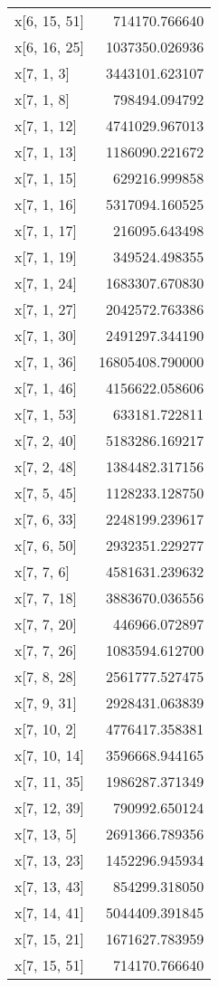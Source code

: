 \begin{longtable}{lr}
x[6, 15, 51] & 714170.766640 \\
x[6, 16, 25] & 1037350.026936 \\
x[7, 1, 3] & 3443101.623107 \\
x[7, 1, 8] & 798494.094792 \\
x[7, 1, 12] & 4741029.967013 \\
x[7, 1, 13] & 1186090.221672 \\
x[7, 1, 15] & 629216.999858 \\
x[7, 1, 16] & 5317094.160525 \\
x[7, 1, 17] & 216095.643498 \\
x[7, 1, 19] & 349524.498355 \\
x[7, 1, 24] & 1683307.670830 \\
x[7, 1, 27] & 2042572.763386 \\
x[7, 1, 30] & 2491297.344190 \\
x[7, 1, 36] & 16805408.790000 \\
x[7, 1, 46] & 4156622.058606 \\
x[7, 1, 53] & 633181.722811 \\
x[7, 2, 40] & 5183286.169217 \\
x[7, 2, 48] & 1384482.317156 \\
x[7, 5, 45] & 1128233.128750 \\
x[7, 6, 33] & 2248199.239617 \\
x[7, 6, 50] & 2932351.229277 \\
x[7, 7, 6] & 4581631.239632 \\
x[7, 7, 18] & 3883670.036556 \\
x[7, 7, 20] & 446966.072897 \\
x[7, 7, 26] & 1083594.612700 \\
x[7, 8, 28] & 2561777.527475 \\
x[7, 9, 31] & 2928431.063839 \\
x[7, 10, 2] & 4776417.358381 \\
x[7, 10, 14] & 3596668.944165 \\
x[7, 11, 35] & 1986287.371349 \\
x[7, 12, 39] & 790992.650124 \\
x[7, 13, 5] & 2691366.789356 \\
x[7, 13, 23] & 1452296.945934 \\
x[7, 13, 43] & 854299.318050 \\
x[7, 14, 41] & 5044409.391845 \\
x[7, 15, 21] & 1671627.783959 \\
x[7, 15, 51] & 714170.766640 \\

\end{longtable}
